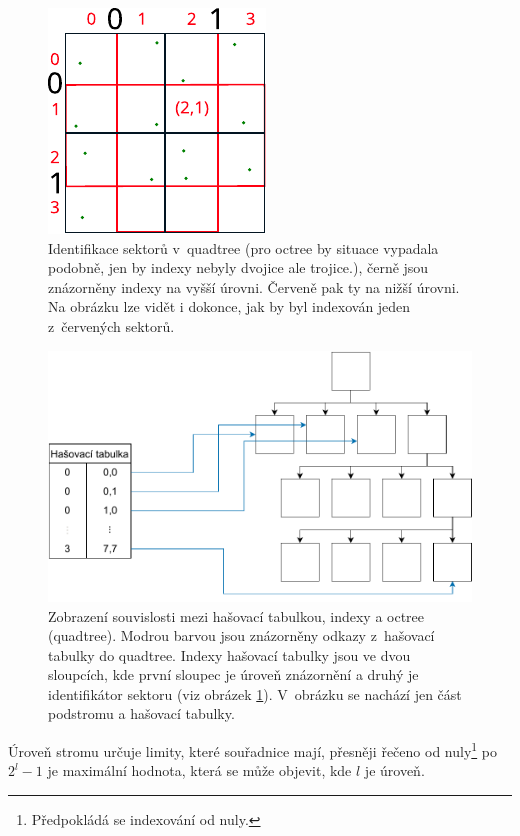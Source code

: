 \begin{figure}
    \centering
    \includegraphics[scale=1.3]{obrazky-figures/hashtree/diagram_idx_prostory.pdf}
    \caption{Identifikace sektorů v~quadtree (pro octree by situace vypadala podobně, jen by indexy nebyly dvojice ale trojice.), černě jsou znázorněny indexy na vyšší úrovni. Červeně pak ty na nižší úrovni. Na obrázku lze vidět i dokonce, jak by byl indexován jeden z~červených sektorů.}
    \label{fig:coordinates-octree}
\end{figure}

\begin{figure}
    \centering
    \includegraphics[scale=.8]{obrazky-figures/hashtree/hashtable_octree.pdf}
    \caption{Zobrazení souvislosti mezi hašovací tabulkou, indexy a octree (quadtree). Modrou barvou jsou znázorněny odkazy z~hašovací tabulky do quadtree. Indexy hašovací tabulky jsou ve dvou sloupcích, kde první sloupec je úroveň znázornění a druhý je identifikátor sektoru (viz obrázek \ref{fig:coordinates-octree}). V~obrázku se nachází jen část podstromu a hašovací tabulky.}
    \label{fig:hashtable_octree}
\end{figure}

Úroveň stromu určuje limity, které souřadnice mají, přesněji řečeno od nuly\footnote{Předpokládá se indexování od nuly.} po \(2^l-1\) je maximální hodnota, která se může objevit, kde \(l\) je úroveň.

